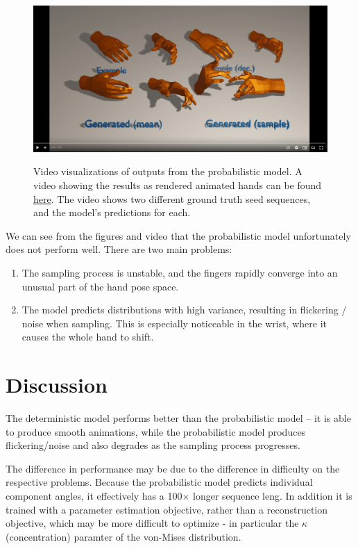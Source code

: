 \begin{figure}
    \centering
    \href{https://www.youtube.com/watch?v=moExsVteA-A}{\includegraphics[width=\linewidth]{figures/probabilistic-model-video-thumbnail.png}}
    \captionsetup{parskip=7pt}
    \caption[Video visualizations of the probabilistic model]{
        Video visualizations of outputs from the probabilistic model. A video showing the results as rendered animated hands can be found \href{https://www.youtube.com/watch?v=moExsVteA-A}{here}. The video shows two different ground truth seed sequences, and the model's predictions for each.}
    \hrulefill
    \label{fig:prob-video}
\end{figure}



We can see from the figures and video that the probabilistic model unfortunately does not perform well. There are two main problems:
\begin{enumerate}
    \item The sampling process is unstable, and the fingers rapidly converge into an unusual part of the hand pose space.
    \item The model predicts distributions with high variance, resulting in flickering / noise when sampling. This is especially noticeable in the wrist, where it causes the whole hand to shift.
\end{enumerate}

\section{Discussion}

The deterministic model performs better than the probabilistic model -- it is able to produce smooth animations, while the probabilistic model produces flickering/noise and also degrades as the sampling process progresses.

The difference in performance may be due to the difference in difficulty on the respective problems. Because the probabilistic model predicts individual component angles, it effectively has a 100$\times$ longer sequence leng. In addition it is trained with a parameter estimation objective, rather than a reconstruction objective, which may be more difficult to optimize - in particular the $\kappa$ (concentration) paramter of the von-Mises distribution.

